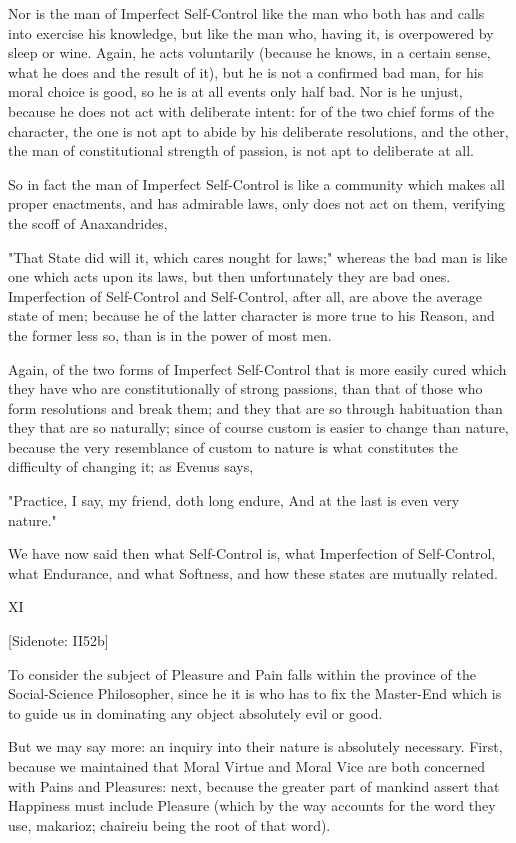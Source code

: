 Nor is the man of Imperfect Self-Control like the man who both has and
calls into exercise his knowledge, but like the man who, having it, is
overpowered by sleep or wine. Again, he acts voluntarily (because he
knows, in a certain sense, what he does and the result of it), but he is
not a confirmed bad man, for his moral choice is good, so he is at all
events only half bad. Nor is he unjust, because he does not act with
deliberate intent: for of the two chief forms of the character, the one
is not apt to abide by his deliberate resolutions, and the other, the
man of constitutional strength of passion, is not apt to deliberate at
all.

So in fact the man of Imperfect Self-Control is like a community which
makes all proper enactments, and has admirable laws, only does not act
on them, verifying the scoff of Anaxandrides,

  "That State did will it, which cares nought for laws;"
whereas the bad man is like one which acts upon its laws, but then
unfortunately they are bad ones. Imperfection of Self-Control and
Self-Control, after all, are above the average state of men; because he
of the latter character is more true to his Reason, and the former less
so, than is in the power of most men.

Again, of the two forms of Imperfect Self-Control that is more easily
cured which they have who are constitutionally of strong passions, than
that of those who form resolutions and break them; and they that are so
through habituation than they that are so naturally; since of course
custom is easier to change than nature, because the very resemblance of
custom to nature is what constitutes the difficulty of changing it; as
Evenus says,

  "Practice, I say, my friend, doth long endure,
  And at the last is even very nature."

We have now said then what Self-Control is, what Imperfection of
Self-Control, what Endurance, and what Softness, and how these states
are mutually related.

XI

[Sidenote: II52b]

To consider the subject of Pleasure and Pain falls within the province
of the Social-Science Philosopher, since he it is who has to fix the
Master-End which is to guide us in dominating any object absolutely evil
or good.

But we may say more: an inquiry into their nature is absolutely
necessary. First, because we maintained that Moral Virtue and Moral Vice
are both concerned with Pains and Pleasures: next, because the greater
part of mankind assert that Happiness must include Pleasure (which by
the way accounts for the word they use, makarioz; chaireiu being the
root of that word).

